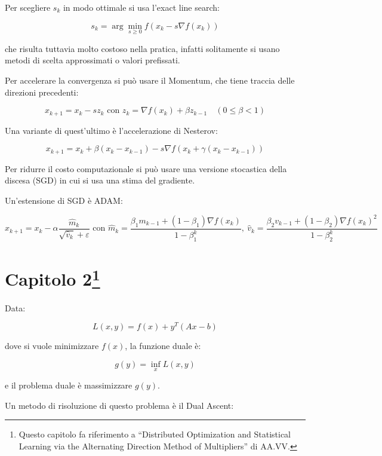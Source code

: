 \documentclass{article}
\begin{document}
Per scegliere \(s_k\) in modo ottimale si usa l'exact line search:

\[
s_k
=
\arg\min_{s\ge0}
f\!\left(x_k-s\nabla f(x_k)\right)
\]

che risulta tuttavia molto costoso nella pratica, infatti solitamente si usano metodi di scelta approssimati o valori prefissati.\newline

Per accelerare la convergenza si può usare il Momentum, che tiene traccia delle direzioni precedenti:

\[
x_{k+1}=x_k-sz_k\text{ con }z_k=\nabla f(x_k)+\beta z_{k-1}\quad (0\le\beta<1)
\]\newline

Una variante di quest'ultimo è l'accelerazione di Nesterov:

\[
x_{k+1}
=
x_k
+
\beta(x_k-x_{k-1})
-
s
\nabla f
\left(
x_k+\gamma(x_k-x_{k-1})
\right)
\]\newline

Per ridurre il costo computazionale si può usare una versione stocastica della discesa (SGD) in cui si usa una stima del gradiente.\newline 

Un'estensione di SGD è ADAM:

\[
x_{k+1}
=
x_k
-
\alpha
\frac{\hat m_k}
{\sqrt{\hat v_k}+\varepsilon}\text{ con }
\hat m_k=\frac{\beta_1m_{k-1}+(1-\beta_1)\nabla f(x_k)}{1-\beta_1^k},\
\hat v_k=\frac{\beta_2v_{k-1}+(1-\beta_2)\nabla f(x_k)^2}{1-\beta_2^k}
\]

\newpage

\section{Capitolo 2\footnote{Questo capitolo fa riferimento a ``Distributed Optimization and Statistical Learning via the Alternating Direction Method of Multipliers'' di AA.VV.}}

Data:

$$
L(x,y)=f(x)+y^T(Ax-b)
$$

\vspace{5pt}

dove si vuole minimizzare $f(x)$, la funzione duale è:

$$
g(y)=\inf_x L(x,y)
$$

e il problema duale è massimizzare $g(y)$.\newline

Un metodo di risoluzione di questo problema è il Dual Ascent:
\end{document}
